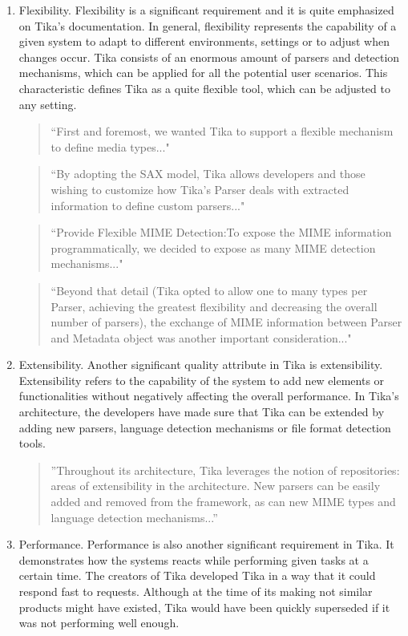 \documentclass{article}
\begin{document}
\begin{enumerate}
    
    \item Flexibility. Flexibility is a significant requirement and it is quite emphasized on Tika's documentation. In general, flexibility represents the capability of a given system to adapt to different environments, settings or to adjust when changes occur. Tika consists of an enormous amount of parsers and detection mechanisms, which can be applied for all the potential user scenarios. This characteristic defines Tika as a quite flexible tool, which can be adjusted to any setting.
    
    \begin{quote}
        ``First and foremost, we wanted Tika to support a flexible mechanism to define media types..."
    \end{quote}
    
    \begin{quote}
        ``By adopting the SAX model, Tika allows developers and those wishing to customize how Tika’s Parser deals with extracted information to define custom parsers..."
    \end{quote}
    
    \begin{quote}
        ``Provide Flexible MIME Detection:To expose the MIME information programmatically, we decided to expose as many MIME detection mechanisms..."
    \end{quote}
    
    \begin{quote}
        ``Beyond that detail (Tika opted to allow one to many types per Parser, achieving the greatest flexibility and decreasing the overall number of parsers), the exchange of MIME information between Parser and Metadata object was another important consideration..."
    \end{quote}
    \item Extensibility. Another significant quality attribute in Tika is extensibility. Extensibility refers to the capability of the system to add new elements or functionalities without negatively affecting the overall performance. In Tika's architecture, the developers have made sure that Tika can be extended by adding new parsers, language detection mechanisms or file format detection tools.
    \begin{quote}
        ''Throughout its architecture, Tika leverages the notion of repositories: areas of extensibility in the architecture. New parsers can be easily added and removed from the framework, as can new MIME types and language detection mechanisms...''
    \end{quote}
    \item Performance. Performance is also another significant requirement in Tika. It demonstrates how the systems reacts while performing given tasks at a certain time. The creators of Tika developed Tika in a way that it could respond fast to requests. Although at the time of its making not similar products might have existed, Tika would have been quickly superseded if it was not performing well enough. 
    

\end{enumerate}
\end{document}
